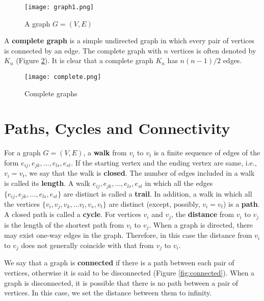 \documentclass[11pt, A4paper, openany, uplatex]{book}
\begin{document}
\begin{appendices}
\begin{figure}[h!]
	\begin{center}
		\texttt{[image: graph1.png]}
		\caption{A graph $G = (V, E)$\label{fig:graph}}
	\end{center}
\end{figure}

A \textbf{complete graph} is a simple undirected graph in which every pair of vertices is connected by an edge.
The complete graph with $n$ vertices is often denoted by $K_n$ (Figure \ref{fig:complete}). 
It is clear that a complete graph $K_n$ has $n(n-1)/2$ edges.

\begin{figure}[h!]
	\begin{center}
		\texttt{[image: complete.png]}
		\caption{Complete graphs\label{fig:complete}}
	\end{center}
\end{figure}

\section{Paths, Cycles and Connectivity}

For a graph $G = (V, E)$, a \textbf{walk} from $v_i$ to $v_t$ is a finite sequence of edges of the form $e_{ij}, e_{jk}, \ldots , e_{ls}, e_{st}$.
If the starting vertex and the ending vertex are same, i.e., $v_i = v_t$, we say that the walk is \textbf{closed}.
The number of edges included in a walk is called its \textbf{length}.
A walk $e_{ij}, e_{jk}, \ldots , e_{ls}, e_{st}$ in which all the edges $\{e_{ij}, e_{jk}, \ldots , e_{ls}, e_{st}\}$ are distinct is called a \textbf{trail}.
In addition, a walk in which all the vertices $\{v_i, v_j, v_k, \ldots v_l, v_s, v_t\}$ are distinct (except, possibly, $v_i = v_t$) is a \textbf{path}.
A closed path is called a \textbf{cycle}.
For vertices $v_i$ and $v_j$, the \textbf{distance} from $v_i$ to $v_j$ is the length of the shortest path from $v_i$ to $v_j$.
When a graph is directed, there may exist one-way edges in the graph.
Therefore, in this case the distance from $v_i$ to $v_j$ does not generally coincide with that from $v_j$ to $v_i$.
\bigskip

We say that a graph is \textbf{connected} if there is a path between each pair of vertices, otherwise it is said to be disconnected (Figure \ref{fig:connected}).
When a graph is disconnected, it is possible that there is no path between a pair of vertices.
In this case, we set the distance between them to infinity.


\end{appendices}
\end{document}
